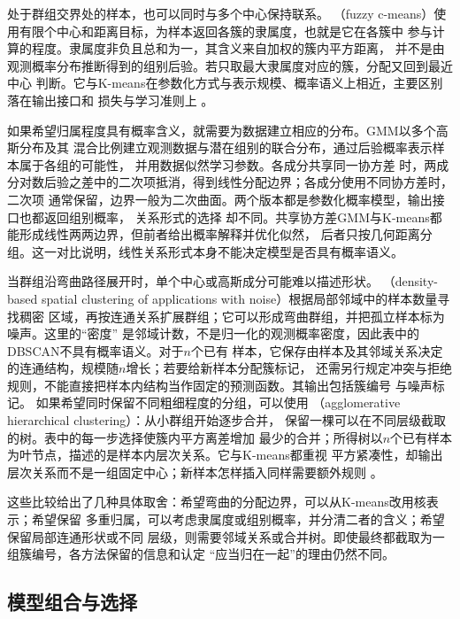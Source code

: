 处于群组交界处的样本，也可以同时与多个中心保持联系。
（fuzzy c-means）使用有限个中心和距离目标，为样本返回各簇的隶属度，也就是它在各簇中
参与计算的程度。隶属度非负且总和为一，其含义来自加权的簇内平方距离，
并不是由观测概率分布推断得到的组别后验。若只取最大隶属度对应的簇，分配又回到最近中心
判断。它与K-means在参数化方式与表示规模、概率语义上相近，主要区别落在输出接口和
损失与学习准则上
。

如果希望归属程度具有概率含义，就需要为数据建立相应的分布。GMM以多个高斯分布及其
混合比例建立观测数据与潜在组别的联合分布，通过后验概率表示样本属于各组的可能性，
并用数据似然学习参数。各成分共享同一协方差
时，两成分对数后验之差中的二次项抵消，得到线性分配边界；各成分使用不同协方差时，二次项
通常保留，边界一般为二次曲面。两个版本都是参数化概率模型，输出接口也都返回组别概率，
关系形式的选择
却不同。共享协方差GMM与K-means都能形成线性两两边界，但前者给出概率解释并优化似然，
后者只按几何距离分组。这一对比说明，线性关系形式本身不能决定模型是否具有概率语义。

当群组沿弯曲路径展开时，单个中心或高斯成分可能难以描述形状。
（density-based spatial clustering of applications with noise）根据局部邻域中的样本数量寻找稠密
区域，再按连通关系扩展群组；它可以形成弯曲群组，并把孤立样本标为噪声。这里的“密度”
是邻域计数，不是归一化的观测概率密度，因此表中的DBSCAN不具有概率语义。对于$n$个已有
样本，它保存由样本及其邻域关系决定的连通结构，规模随$n$增长；若要给新样本分配簇标记，
还需另行规定冲突与拒绝规则，不能直接把样本内结构当作固定的预测函数。其输出包括簇编号
与噪声标记。
如果希望同时保留不同粗细程度的分组，可以使用
（agglomerative hierarchical clustering）：从小群组开始逐步合并，
保留一棵可以在不同层级截取的树。表中的每一步选择使簇内平方离差增加
最少的合并；所得树以$n$个已有样本为叶节点，描述的是样本内层次关系。它与K-means都重视
平方紧凑性，却输出层次关系而不是一组固定中心；新样本怎样插入同样需要额外规则
。

这些比较给出了几种具体取舍：希望弯曲的分配边界，可以从K-means改用核表示；希望保留
多重归属，可以考虑隶属度或组别概率，并分清二者的含义；希望保留局部连通形状或不同
层级，则需要邻域关系或合并树。即使最终都截取为一组簇编号，各方法保留的信息和认定
“应当归在一起”的理由仍然不同。

\FloatBarrier
\subsection{模型组合与选择}
\label{sec:models-combination-selection}

